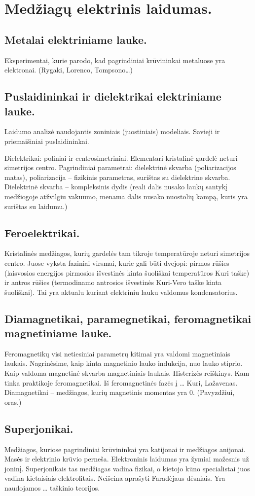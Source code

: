 \chapter{Medžiagų elektrinis laidumas.}
\section{Metalai elektriniame lauke.}
Eksperimentai, kurie parodo, kad pagrindiniai krūvininkai metaluose yra
elektronai. (Rygaki, Lorenco, Tompsono…)
\section{Puslaidininkai ir dielektrikai elektriniame lauke.}
Laidumo analizė naudojantis zoniniais (juostiniais) modeliais.
Savieji ir priemaišiniai puslaidininkai.

Dielektrikai: poliniai ir centrosimetriniai. Elementari kristalinė
gardelė neturi simetrijos centro. Pagrindiniai parametrai: dielektrinė
skvarba (poliarizacijos matas), poliarizacija – fizikinis parametras,
surištas su dielektrine skvarba. Dielektrinė skvarba – kompleksinis dydis
(reali dalis nusako laukų santykį medžiogoje atžvilgiu vakuumo, menama
dalis nusako nuostolių kampą, kuris yra surištas su laidumu.)
\section{Feroelektrikai.}
Kristalinės medžiagos, kurių gardelės tam tikroje temperatūroje neturi
simetrijos centro. Juose vyksta faziniai virsmai, kurie gali būti
dvejopi: pirmos rūšies (laisvosios energijos pirmosios išvestinės
kinta šuoliškai temperatūros Kuri taške) ir antros rūšies (termodinamo
antrosios išvestinės Kuri-Vero taške kinta šuoliškai). Tai yra
aktualu kuriant elektriniu lauku valdomus kondensatorius.
\section{Diamagnetikai, paramegnetikai, feromagnetikai magnetiniame lauke.}
Feromagnetikų visi netiesiniai parametrų kitimai yra valdomi magnetiniais
laukais. Nagrinėsime, kaip kinta magnetinio lauko indukcija, nuo
lauko stiprio. Kaip valdoma magnetinė skvarba magnetiniais laukais.
Histerizės reiškinys. Kam tinka praktikoje feromagnetikai. Iš
feromagnetinės fazės į … Kuri, Lažavenas. Diamagnetikai – medžiagos, kurių
magnetinis momentas yra 0. (Pavyzdžiui, oras.)
\section{Superjonikai.}
Medžiagos, kuriose pagrindiniai krūvininkai yra katijonai ir medžiagos
anijonai. Masės ir elektrinio krūvio perneša. Elektroninis laidumas yra
žymiai mažesnis už joninį. Superjonikais tas medžiagas vadina fizikai,
o kietojo kūno specialistai juos vadina kietaisiais elektrolitais.
Neišeina aprašyti Faradėjaus dėsniais. Yra naudojamos … taškinio teorijos.
